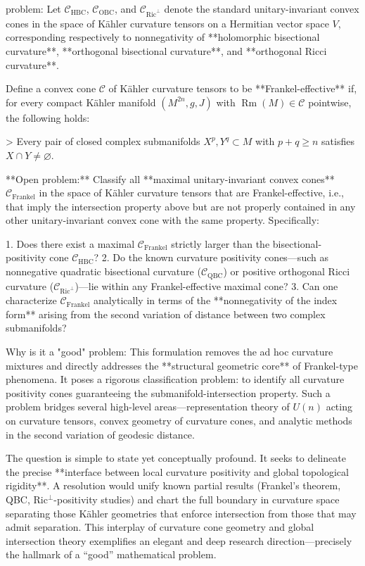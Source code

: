 problem:  
Let \(\mathcal{C}_{\text{HBC}}\), \(\mathcal{C}_{\text{OBC}}\), and \(\mathcal{C}_{\text{Ric}^\perp}\) denote the standard unitary-invariant convex cones in the space of Kähler curvature tensors on a Hermitian vector space \(V\), corresponding respectively to nonnegativity of **holomorphic bisectional curvature**, **orthogonal bisectional curvature**, and **orthogonal Ricci curvature**.  

Define a convex cone \(\mathcal{C}\) of Kähler curvature tensors to be **Frankel-effective** if, for every compact Kähler manifold \((M^{2n}, g, J)\) with \(\operatorname{Rm}(M)\in \mathcal{C}\) pointwise, the following holds:

> Every pair of closed complex submanifolds \(X^p, Y^q \subset M\) with \(p+q \ge n\) satisfies \(X\cap Y \neq \varnothing.\)

**Open problem:**  
Classify all **maximal unitary-invariant convex cones** \(\mathcal{C}_{\mathrm{Frankel}}\) in the space of Kähler curvature tensors that are Frankel-effective, i.e., that imply the intersection property above but are not properly contained in any other unitary-invariant convex cone with the same property. Specifically:

1. Does there exist a maximal \(\mathcal{C}_{\mathrm{Frankel}}\) strictly larger than the bisectional-positivity cone \(\mathcal{C}_{\text{HBC}}\)?  
2. Do the known curvature positivity cones—such as nonnegative quadratic bisectional curvature (\(\mathcal{C}_{\text{QBC}}\)) or positive orthogonal Ricci curvature (\(\mathcal{C}_{\text{Ric}^\perp}\))—lie within any Frankel-effective maximal cone?  
3. Can one characterize \(\mathcal{C}_{\mathrm{Frankel}}\) analytically in terms of the **nonnegativity of the index form** arising from the second variation of distance between two complex submanifolds?  

Why is it a "good" problem:  
This formulation removes the ad hoc curvature mixtures and directly addresses the **structural geometric core** of Frankel-type phenomena. It poses a rigorous classification problem: to identify all curvature positivity cones guaranteeing the submanifold-intersection property. Such a problem bridges several high-level areas—representation theory of \(U(n)\) acting on curvature tensors, convex geometry of curvature cones, and analytic methods in the second variation of geodesic distance.

The question is simple to state yet conceptually profound. It seeks to delineate the precise **interface between local curvature positivity and global topological rigidity**. A resolution would unify known partial results (Frankel’s theorem, QBC, Ric\(^\perp\)-positivity studies) and chart the full boundary in curvature space separating those Kähler geometries that enforce intersection from those that may admit separation. This interplay of curvature cone geometry and global intersection theory exemplifies an elegant and deep research direction—precisely the hallmark of a “good” mathematical problem.